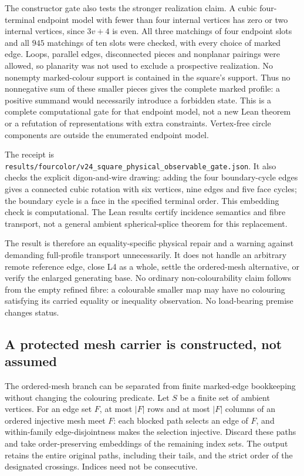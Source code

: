 The constructor gate also tests the stronger realization claim. A cubic
four-terminal endpoint model with fewer than four internal vertices has
zero or two internal vertices, since $3v+4$ is even. All three matchings
of four endpoint slots and all $945$ matchings of ten slots were checked,
with every choice of marked edge. Loops, parallel edges, disconnected
pieces and nonplanar pairings were allowed, so planarity was not used to
exclude a prospective realization. No nonempty marked-colour support is
contained in the square's support. Thus no nonnegative sum of these
smaller pieces gives the complete marked profile: a positive summand
would necessarily introduce a forbidden state. This is a complete
computational gate for that endpoint model, not a new Lean theorem or a
refutation of representations with extra constraints. Vertex-free circle
components are outside the enumerated endpoint model.

The receipt is
\texttt{results/fourcolor/v24\_square\_physical\_observable\_gate.json}.
It also checks the explicit digon-and-wire drawing: adding the four
boundary-cycle edges gives a connected cubic rotation with six vertices,
nine edges and five face cycles; the boundary cycle is a face in the
specified terminal order. This embedding check is computational. The
Lean results certify incidence semantics and fibre transport, not a
general ambient spherical-splice theorem for this replacement.

The result is therefore an equality-specific physical repair and a warning
against demanding full-profile transport unnecessarily. It does not
handle an arbitrary remote reference edge, close L4 as a whole, settle the
ordered-mesh alternative, or verify the enlarged generating base. No
ordinary non-colourability claim follows from the empty refined fibre:
a colourable smaller map may have no colouring satisfying its carried
equality or inequality observation. No
load-bearing premise changes status.

\subsection{A protected mesh carrier is constructed, not assumed}
\label{sec:protected-mesh-carrier}

The ordered-mesh branch can be separated from finite marked-edge
bookkeeping without changing the colouring predicate. Let $S$ be a finite
set of ambient vertices. For an edge set $F$, at most $|F|$ rows and at
most $|F|$ columns of an ordered injective mesh meet $F$: each blocked
path selects an edge of $F$, and within-family edge-disjointness makes
the selection injective. Discard these paths and take order-preserving
embeddings of the remaining index sets. The output retains the entire
original paths, including their tails, and the strict order of the
designated crossings. Indices need not be consecutive.

